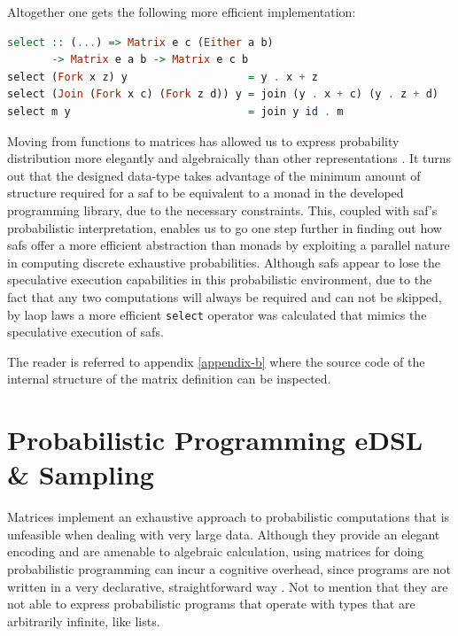 \documentclass[
  oneside,
  11pt, a4paper,
  footinclude=true,
  headinclude=true,
  cleardoublepage=empty
]{scrbook}
\theoremstyle{definition}
\theoremstyle{definition}
\begin{document}
        \noindent Altogether one gets the following more efficient implementation:
        
        \begin{lstlisting}[language=Haskell, caption={Final result},captionpos=b]
select :: (...) => Matrix e c (Either a b) 
       -> Matrix e a b -> Matrix e c b
select (Fork x z) y                   = y . x + z
select (Join (Fork x c) (Fork z d)) y = join (y . x + c) (y . z + d)
select m y                            = join y id . m
        \end{lstlisting}{}
        
        Moving from functions to matrices has allowed us to express probability distribution more elegantly and algebraically than other representations \citep{erwig_kollmansberger_2006, kidd2007build}. It turns out that the designed data-type takes advantage of the minimum amount of structure required for a \gls{saf} to be equivalent to a monad in the developed programming library, due to the necessary constraints. This, coupled with \gls{saf}'s probabilistic interpretation, enables us to go one step further in finding out how \glspl{saf} offer a more efficient abstraction than monads by exploiting a parallel nature in computing discrete exhaustive probabilities. Although \glspl{saf} appear to lose the speculative execution capabilities in this probabilistic environment, due to the fact that any two computations will always be required and can not be skipped, by \gls{laop} laws a more efficient \texttt{select} operator was calculated that mimics the speculative execution of \glspl{saf}.
        
        The reader is referred to appendix \ref{appendix-b} where the source code of the internal structure of the matrix definition can be inspected.
        
    \section{Probabilistic Programming eDSL \& Sampling}\label{prob-edsl}
    
    Matrices implement an exhaustive approach to probabilistic computations that is unfeasible when dealing with very large data. Although they provide an elegant encoding and are amenable to algebraic calculation, using matrices for doing probabilistic programming can incur a cognitive overhead, since programs are not written in a very declarative, straightforward way \citep{poll-aop, brusilovsky1994teaching}. Not to mention that they are not able to express probabilistic programs that operate with types that are arbitrarily infinite, like lists.
    
\end{document}
